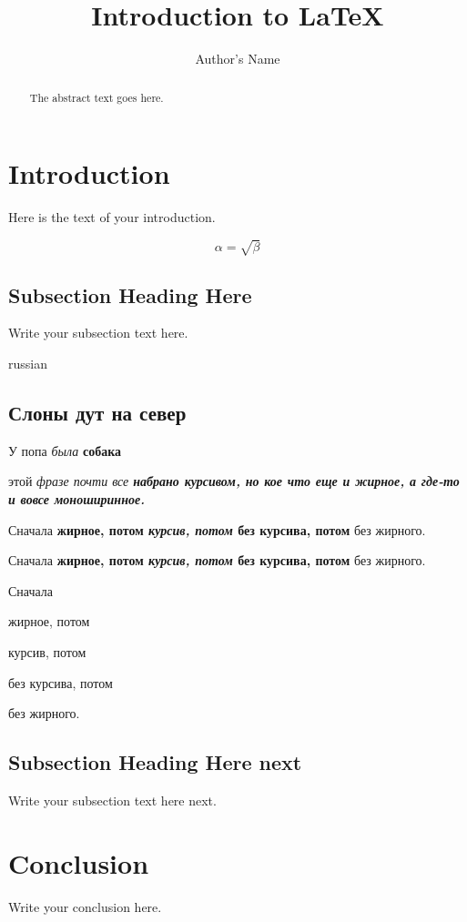\documentclass[oneside,final,14pt]{extreport}
\begin{document}
\title{Introduction to \LaTeX{}}
\author{Author's Name}

\maketitle

\begin{abstract}
The abstract text goes here.
\end{abstract}

\section{Introduction}
Here is the text of your introduction.

\begin{equation}
    \label{simple_equation}
    \alpha = \sqrt{ \beta }
\end{equation}

\subsection{Subsection Heading Here}
Write your subsection text here.

\begin{otherlanguage*}{russian}
\subsection{Слоны дут на север}
У попа {\it была} {\bf собака}

 этой \itshape фразе почти все \bfseries 
набрано курсивом, \ttfamily но кое что
\upshape еще и жирное, \rmfamily а где-то
и вовсе \mdseries моноширинное.

Сначала {\bfseries жирное, потом {\itshape курсив, потом} без курсива, потом} без жирного.

Сначала \textbf{жирное, потом \textit{курсив, потом} без курсива, потом} без жирного.

Сначала \begin{fbseries} жирное, потом 
        \begin{itshape} курсив, потом
        \end{itshape}без курсива, потом
        \end{fbseries} без жирного.


\end{otherlanguage*}

\subsection{Subsection Heading Here next}
Write your subsection text here next.

\section{Conclusion}
Write your conclusion here.
\end{document}
